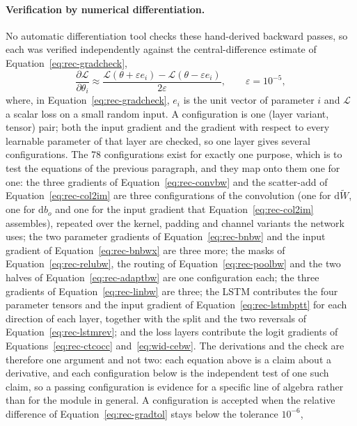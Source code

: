 \paragraph{Verification by numerical differentiation.}
No automatic differentiation tool checks these hand-derived backward passes, so each was verified independently against the central-difference estimate of Equation~\ref{eq:rec-gradcheck},
\begin{equation}
\frac{\partial\mathcal L}{\partial\theta_i}\approx\frac{\mathcal L(\theta+\varepsilon e_i)-\mathcal L(\theta-\varepsilon e_i)}{2\varepsilon},\qquad\varepsilon=10^{-5},
\label{eq:rec-gradcheck}
\end{equation}
where, in Equation~\ref{eq:rec-gradcheck}, $e_i$ is the unit vector of parameter $i$ and $\mathcal L$ a scalar loss on a small random input.
A configuration is one (layer variant, tensor) pair; both the input gradient and the gradient with respect to every learnable parameter of that layer are checked, so one layer gives several configurations.
The 78 configurations exist for exactly one purpose, which is to test the equations of the previous paragraph, and they map onto them one for one: the three gradients of Equation~\ref{eq:rec-convbw} and the scatter-add of Equation~\ref{eq:rec-col2im} are three configurations of the convolution (one for $\mathrm d\tilde W$, one for $\mathrm db_o$ and one for the input gradient that Equation~\ref{eq:rec-col2im} assembles), repeated over the kernel, padding and channel variants the network uses; the two parameter gradients of Equation~\ref{eq:rec-bnbw} and the input gradient of Equation~\ref{eq:rec-bnbwx} are three more; the masks of Equation~\ref{eq:rec-relubw}, the routing of Equation~\ref{eq:rec-poolbw} and the two halves of Equation~\ref{eq:rec-adaptbw} are one configuration each; the three gradients of Equation~\ref{eq:rec-linbw} are three; the LSTM contributes the four parameter tensors and the input gradient of Equation~\ref{eq:rec-lstmbptt} for each direction of each layer, together with the split and the two reversals of Equation~\ref{eq:rec-lstmrev}; and the loss layers contribute the logit gradients of Equations~\ref{eq:rec-ctcocc} and~\ref{eq:wid-cebw}.
The derivations and the check are therefore one argument and not two: each equation above is a claim about a derivative, and each configuration below is the independent test of one such claim, so a passing configuration is evidence for a specific line of algebra rather than for the module in general.
A configuration is accepted when the relative difference of Equation~\ref{eq:rec-gradtol} stays below the tolerance $10^{-6}$,
